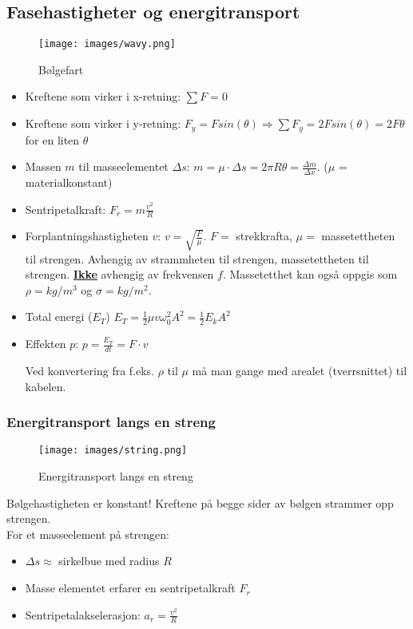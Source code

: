 \documentclass[12pt]{article}
\begin{document}
\subsection{Fasehastigheter og energitransport}
\begin{figure} [H]
    \centering
    \texttt{[image: images/wavy.png]}
    \caption{Bølgefart}
\end{figure}
\begin{itemize}
    \item[] Kreftene som virker i x-retning: $\sum F = 0$
    \item[] Kreftene som virker i y-retning: $F_y = Fsin(\theta) \Rightarrow \sum F_y = 2Fsin(\theta) = 2F\theta$ for en liten $\theta$
    \item[] Massen $m$ til masseelementet $\Delta s$: $m = \mu \cdot \Delta s = 2\pi R\theta = \frac{\Delta m}{\Delta x}$. ($\mu$ = materialkonstant)
    \item[] Sentripetalkraft: $F_r = m \frac{v^2}{R}$
    \item[] Forplantningshastigheten $v$: $v = \sqrt{\frac{F}{\mu}}$. $F =$ strekkrafta, $\mu =$ massetettheten til strengen. Avhengig av strammheten til strengen, massetettheten til strengen. \underline{\textbf{Ikke}} avhengig av frekvensen $f$.  Massetetthet kan også oppgis som $\rho = kg/m^3 $ og $\sigma = kg/m^2 $.
    \item[] Total energi ($E_T$) $E_T = \frac{1}{2}\mu v \omega_0^2A^2 = \frac{1}{2}E_k A^2$
    \item[] Effekten $p$: $p = \frac{E_T}{dt} = F \cdot v$

Ved konvertering fra f.eks. $\rho$ til $\mu$ må man gange med arealet (tverrsnittet) til kabelen.
\end{itemize}
\subsubsection{Energitransport langs en streng}
\begin{figure} [H]
    \centering
    \texttt{[image: images/string.png]}
    \caption{Energitransport langs en streng}
\end{figure}

Bølgehastigheten er konstant! Kreftene på begge sider av bølgen strammer opp strengen.\\
For et masseelement på strengen:
\begin{itemize}
    \item[] $\Delta s \approx$ sirkelbue med radius $R$
    \item[] Masse elementet erfarer en sentripetalkraft $F_r$
    \item[] Sentripetalakselerasjon: $a_r = \frac{v^2}{R}$
\end{itemize}
\end{document}
